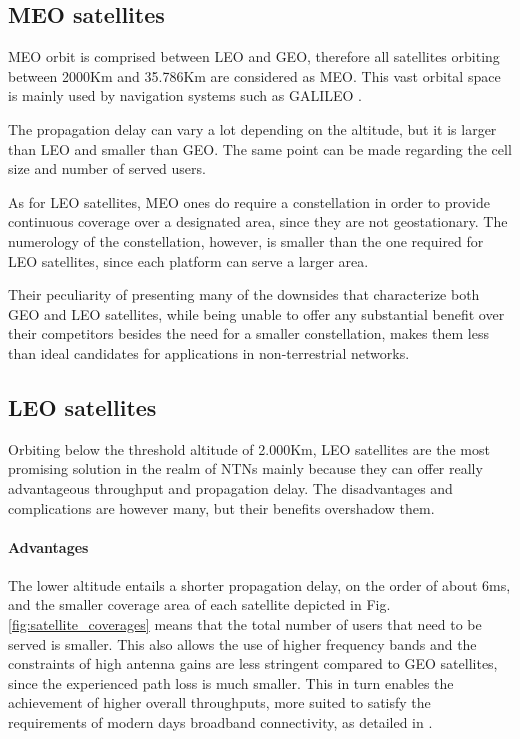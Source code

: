 \subsection{MEO satellites}
\ac{MEO} orbit is comprised between \ac{LEO} and \ac{GEO}, therefore all satellites orbiting between 2000Km and 35.786Km are considered as \ac{MEO}. This vast orbital space is mainly used by navigation systems such as GALILEO \cite{types-of-orbits-esa}.

The propagation delay can vary a lot depending on the altitude, but it is larger than \ac{LEO} and smaller than \ac{GEO}. The same point can be made regarding the cell size and number of served users. 

As for \ac{LEO} satellites, \ac{MEO} ones do require a constellation in order to provide continuous coverage over a designated area, since they are not geostationary. The numerology of the constellation, however, is smaller than the one required for \ac{LEO} satellites, since each platform can serve a larger area.

Their peculiarity of presenting many of the downsides that characterize both \ac{GEO} and \ac{LEO} satellites, while being unable to offer any substantial benefit over their competitors besides the need for a smaller constellation, makes them less than ideal candidates for applications in non-terrestrial networks.

\subsection{LEO satellites}
\label{sec:leo}
Orbiting below the threshold altitude of 2.000Km, \ac{LEO} satellites are the most promising solution in the realm of \ac{NTNs} mainly because they can offer really advantageous throughput and propagation delay. The disadvantages and complications are however many, but their benefits overshadow them.

\paragraph{Advantages}
The lower altitude entails a shorter propagation delay, on the order of about 6ms, and the smaller coverage area of each satellite depicted in Fig. \ref{fig:satellite_coverages} means that the total number of users that need to be served is smaller. This also allows the use of higher frequency bands and the constraints of high antenna gains are less stringent compared to \ac{GEO} satellites, since the experienced path loss is much smaller. This in turn enables the achievement of higher overall throughputs, more suited to satisfy the requirements of modern days broadband connectivity, as detailed in \cite{satellite-communication-mmwave-giordani}.

